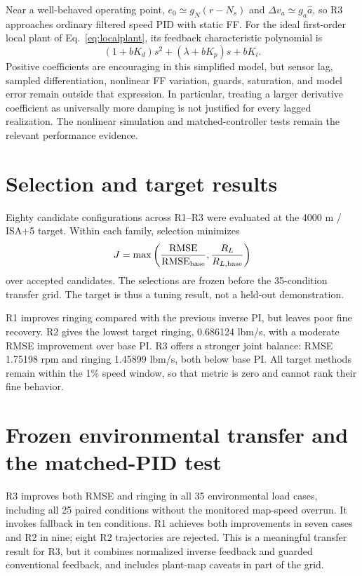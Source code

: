 Near a well-behaved operating point, $e_0\simeq g_N(r-N_s)$ and $\Delta v_a\simeq g_a\hat a$, so R3 approaches ordinary filtered speed PID with static FF. For the ideal first-order local plant of Eq.~\eqref{eq:localplant}, its feedback characteristic polynomial is
\begin{equation}
(1+bK_d)s^2+(\lambda+bK_p)s+bK_i.
\end{equation}
Positive coefficients are encouraging in this simplified model, but sensor lag, sampled differentiation, nonlinear FF variation, guards, saturation, and model error remain outside that expression. In particular, treating a larger derivative coefficient as universally more damping is not justified for every lagged realization. The nonlinear simulation and matched-controller tests remain the relevant performance evidence.

\section{Selection and target results}
Eighty candidate configurations across R1--R3 were evaluated at the 4000 m / ISA+5 target. Within each family, selection minimizes
\begin{equation}
J=\max\left(\frac{\operatorname{RMSE}}{\operatorname{RMSE}_{\rm base}},\frac{R_L}{R_{L,\rm base}}\right)
\end{equation}
over accepted candidates. The selections are frozen before the 35-condition transfer grid. The target is thus a tuning result, not a held-out demonstration.


R1 improves ringing compared with the previous inverse PI, but leaves poor fine recovery. R2 gives the lowest target ringing, 0.686124 lbm/s, with a moderate RMSE improvement over base PI. R3 offers a stronger joint balance: RMSE 1.75198 rpm and ringing 1.45899 lbm/s, both below base PI. All target methods remain within the 1\% speed window, so that metric is zero and cannot rank their fine behavior.


\section{Frozen environmental transfer and the matched-PID test}

R3 improves both RMSE and ringing in all 35 environmental load cases, including all 25 paired conditions without the monitored map-speed overrun. It invokes fallback in ten conditions. R1 achieves both improvements in seven cases and R2 in nine; eight R2 trajectories are rejected. This is a meaningful transfer result for R3, but it combines normalized inverse feedback and guarded conventional feedback, and includes plant-map caveats in part of the grid.

